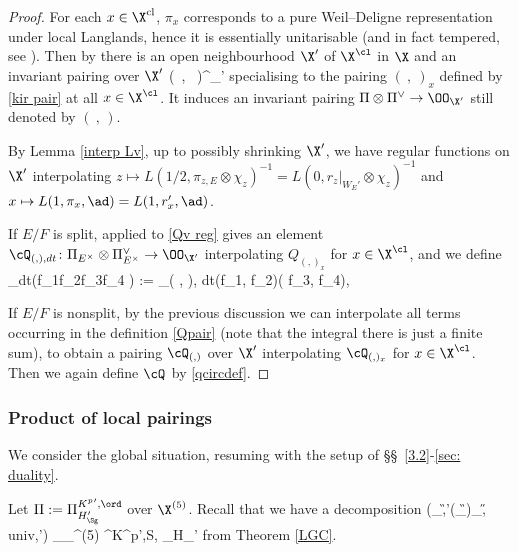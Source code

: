 \begin{proof}
For each $x\in \X^{\rm cl}$, $\pi_{x}$ corresponds to a pure Weil--Deligne representation under local Langlands, hence it is essentially unitarisable (and in fact tempered, see \cite[Lemma 1.4 (3)]{TY}).
Then by \cite[Lemma 5.2.5]{LLC}
there is an open neighbourhood $\X'$
of $\X^{\cl}$ in $\X$ and an invariant  pairing over $\X'$
\beq
\label{inv pair family}
(\ , \, )\colon \pi\otimes \pi^{\vee}\to \OO_{\X'}
\eeq
specialising to   the pairing $(\ , \ )_{x}$ defined by  \eqref{kir pair} at all $x\in \X^{\cl}$.  It induces an invariant pairing $ \Pi\otimes \Pi^{\vee}\to \OO_{\X'}$ still denoted by $(\ , \, )$.



By Lemma \ref{interp Lv}, up to possibly shrinking $\X'$, we have regular functions on $\X'$ interpolating   $z\mapsto L(1/2, \pi_{z,E}\otimes\chi_{z})^{-1}=L(0, r_{z}|_{W_{E}'} \otimes \chi_{z})^{-1}$ and $x\mapsto L(1, \pi_{x}, \ad)=L(1, r_{x}', \ad)$.

If $E/F$ is split,   \cite[Proposition 5.2.4]{LLC}
 applied to \eqref{Qv reg} gives an element $\cQ_{(, ),dt}\colon \Pi_{E^{\times}}\otimes \Pi_{E^{\times}}^{\vee}\to \OO_{\X' }$ interpolating $Q_{(, )_{x}}$ for $x\in \X^{\cl}$, and we define
\beq\label{qcircdef}
\cQ_{dt}\left({f_{1}\ot f_{2}\over f_{3}\ot f_{4} }\right) := {\cQ_{( , ), dt}(f_{1}, f_{2})\over ( f_{3}, f_{4})},
\eeq

If $E/F$ is nonsplit, by the previous discussion we can interpolate all terms occurring in the definition  \eqref{Qpair} (note that the integral there is just a finite sum), to obtain a pairing  $\cQ_{(,)}$ over $\X'$ interpolating $\cQ_{(,)_{x}}$ for $x\in \X^{\cl}$. Then we again define $\cQ^{}$ by \eqref{qcircdef}.
\end{proof}

\subsubsection{Product of local pairings} We  consider the global situation,
 resuming with the setup of \S\S~\ref{3.2}-\ref{sec: duality}.


Let $\Pi:=\Pi^{K^{p}{}',  \ord}_{{{H_{\Sg}'}}}$ over $\X^{(5)}$.
Recall that we have a decomposition
\beq\label{deco}
\Pi
\cong (\pi_{\G,\Sg'}(\cV_{\G})\otimes \chi_{\H, {\rm univ},{\Sg'}})
\otimes_{\OO_{\X^{(5)}}}
  \Pi^{K^{p}{}',S,  \ord}_{{H_{\Sg}'}}
  \eeq
from Theorem \ref{LGC}.



